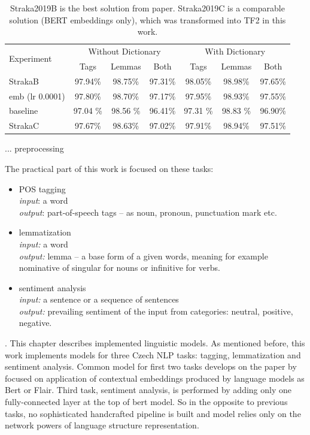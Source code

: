 \begin{table}[!h]
  \begin{tabular}{|l||c|c|c||c|c|c|}
  \hline
\multirow{2}{*}{Experiment} & \multicolumn{3}{c||}{Without Dictionary}  &
      \multicolumn{3}{c|}{With Dictionary} \\ 
    & Tags & Lemmas & Both & Tags & Lemmas & Both \\ \hline
    StrakaB & 97.94\% & 98.75\% & 97.31\% & 98.05\% & 98.98\% & 97.65\% \\ \hline
    emb (lr 0.0001) &  97.80\% & 98.70\% & 97.17\% & 97.95\% & 98.93\% & 97.55\% \\ \hline
    baseline & 97.04 \% & 98.56 \% & 96.41\% &  97.31  \% & 98.83 \% & 96.90\% \\ \hline 
    StrakaC & 97.67\% & 98.63\% & 97.02\% & 97.91\% & 98.94\% & 97.51\% \\ \hline
  \end{tabular}
  \caption{%
  Straka2019B is the best solution from \citep{Straka2019} paper. Straka2019C is a comparable solution  (BERT embeddings only), which was transformed into TF2 in this work.} 
\end{table}

\citep{Horsmann}
\citep{Plank}
\citep{Plisson}
\citep{Straka2019b}
\citep{Straka2019a}
\citep{Toutanova2003}
\citep{Wang2015}
\citep{Huang2015}
\citep{Collobert2011} ... preprocessing

The practical part of this work is focused on these tasks:
\begin{itemize}
\item POS tagging \\
\textit{input}: a word \\
\textit{output}: part-of-speech tags -- as noun, pronoun, punctuation mark etc.
\item lemmatization \\
\textit{input:} a word \\
\textit{output:} lemma -- a base form of a given words, meaning for example nominative of singular for nouns or infinitive for verbs. 
\item sentiment analysis \\
\textit{input:} a sentence or a sequence of sentences \\
\textit{output:} prevailing sentiment of the input from categories: neutral, positive, negative.
\end{itemize}.
\label{chap:impl}
This chapter describes implemented linguistic models. As mentioned before, this work implements models for three Czech NLP tasks: tagging, lemmatization and sentiment analysis. Common model for first two tasks develops on the paper by \cite[]{straka2019czech} focused on application of contextual embeddings produced by language models as Bert %
 or Flair. %
 Third task, sentiment analysis, is performed by adding only one fully-connected layer at the top of bert model. So in the opposite to previous tasks, no sophisticated handcrafted pipeline is built and model relies only on the network powers of language structure representation.
